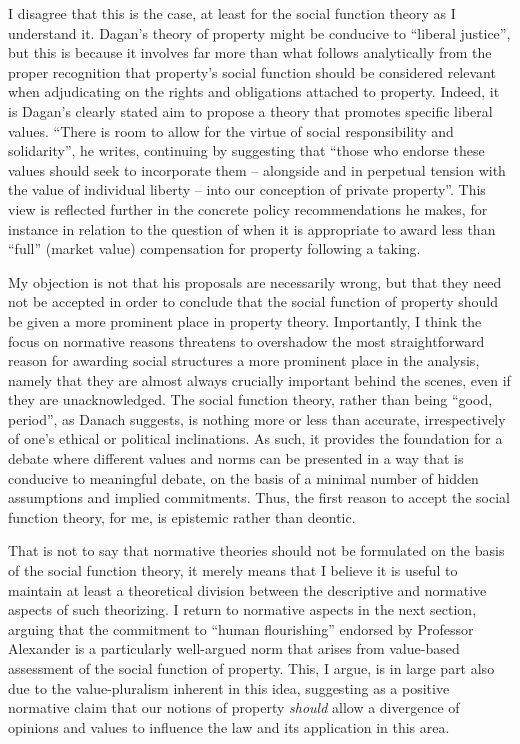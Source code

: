 I disagree that this is the case, at least for the social function theory as I understand it. Dagan's theory of property might be conducive to ``liberal justice'', but this is because it involves far more than what follows analytically from the proper recognition that property's social function should be considered relevant when adjudicating on the rights and obligations attached to property. Indeed, it is Dagan's clearly stated aim to propose a theory that promotes specific liberal values. ``There is room to allow for the virtue of social responsibility and solidarity'', he writes, continuing by suggesting that ``those who endorse these values should seek to incorporate them -- alongside and in perpetual tension with the value of individual liberty -- into our conception of private property''. This view is reflected further in the concrete policy recommendations he makes, for instance in relation to the question of when it is appropriate to award less than ``full'' (market value) compensation for property following a taking.

My objection is not that his proposals are necessarily wrong, but that they need not be accepted in order to conclude that the social function of property should be given a more prominent place in property theory. Importantly, I think the focus on normative reasons threatens to overshadow the most straightforward reason for awarding social structures a more prominent place in the analysis, namely that they are almost always crucially important behind the scenes, even if they are unacknowledged. The social function theory, rather than being ``good, period'', as Danach suggests, is nothing more or less than accurate, irrespectively of one's ethical or political inclinations. As such, it provides the foundation for a debate where different values and norms can be presented in a way that is conducive to meaningful debate, on the basis of a minimal number of hidden assumptions and implied commitments. Thus, the first reason to accept the social function theory, for me, is epistemic rather than deontic.

That is not to say that normative theories should not be formulated on the basis of the social function theory, it merely means that I believe it is useful to maintain at least a theoretical division between the descriptive and normative aspects of such theorizing. I return to normative aspects in the next section, arguing that the commitment to ``human flourishing'' endorsed by Professor Alexander is a particularly well-argued norm that arises from value-based assessment of the social function of property. This, I argue, is in large part also due to the value-pluralism inherent in this idea, suggesting as a positive normative claim that our notions of property {\it should} allow a divergence of opinions and values to influence the law and its application in this area.

